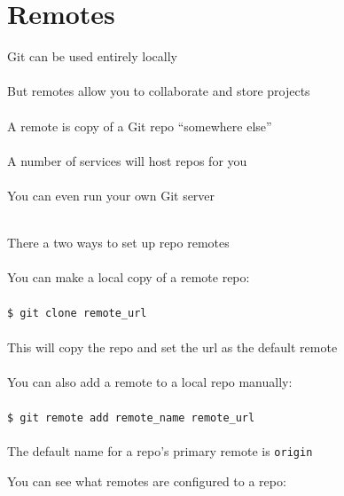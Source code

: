 \documentclass{beamer}
\begin{document}
\section{Remotes}
\begin{frame}[allowframebreaks]{\secname}
    Git can be used entirely locally\\~\\

    But remotes allow you to collaborate and store projects\\~\\

    A remote is copy of a Git repo ``somewhere else''\\~\\

    A number of services will host repos for you\\~\\

    You can even run your own Git server\\~\\

\framebreak

    There a two ways to set up repo remotes \\~\\

    You can make a local copy of a remote repo: \\~\\

    {\tt \$ git clone remote\_url} \\~\\

    This will copy the  repo and set the url as the default remote
    \\~\\

    You can also add a remote to a local repo manually: \\~\\

    {\tt \$ git remote add remote\_name remote\_url} \\~\\

    The default name for a repo's primary remote is {\tt origin}
    
\framebreak
    
    You can see what remotes are configured to a repo: \\~\\


\end{frame}
\end{document}
